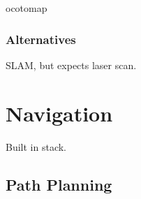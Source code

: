 ocotomap

\subsubsection{Alternatives}

SLAM, but expects laser scan.


\section{Navigation}

Built in stack.

\subsection{Path Planning}
